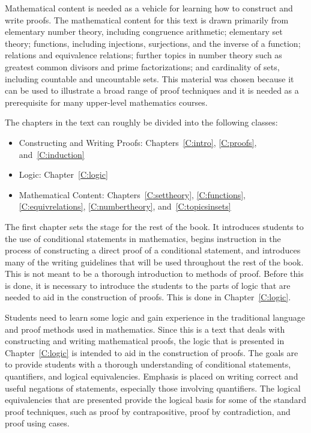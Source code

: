 Mathematical content is needed as a vehicle for learning how to construct and write proofs.  The mathematical content for this text is drawn primarily from elementary number theory, including congruence arithmetic; elementary set theory; functions, including injections, surjections, and the inverse of a function; relations and equivalence relations; further topics in number theory such as greatest common divisors and prime factorizations; and cardinality of sets, including countable and uncountable sets.  This material was chosen because it can be used to illustrate a broad range of proof techniques and it is needed as a prerequisite for many upper-level mathematics courses.

The chapters in the text can roughly be divided into the following classes:

\begin{itemize}
\item Constructing and Writing Proofs:  Chapters~\ref{C:intro}, \ref{C:proofs}, and~\ref{C:induction}
\item Logic: Chapter~\ref{C:logic}
\item Mathematical Content: Chapters~\ref{C:settheory}, \ref{C:functions}, \ref{C:equivrelations}, \ref{C:numbertheory}, and~\ref{C:topicsinsets}
\end{itemize}

The first chapter sets the stage for the rest of the book.  It introduces students to the use of conditional statements in mathematics, begins instruction in the process of constructing a direct proof of a conditional statement, and introduces many of the writing guidelines that will be used throughout the rest of the book.  This is not meant to be a thorough introduction to methods of proof.  Before this is done, it is necessary to introduce the students to the parts of logic that are needed to aid in the construction of proofs.  This is done in 
Chapter~\ref{C:logic}.  

Students need to learn some logic and gain experience in the traditional language and proof methods used in mathematics. Since this is a text that deals with constructing and writing mathematical proofs, the logic that is presented in Chapter~\ref{C:logic} is intended to aid in the construction of proofs.  The goals are to provide students with a thorough understanding of conditional statements, quantifiers, and logical equivalencies.  Emphasis is placed on writing correct and useful negations of statements, especially those involving quantifiers.  The logical equivalencies that are presented provide the logical basis for some of the standard proof techniques, such as proof by contrapositive, proof by contradiction, and proof using cases.

